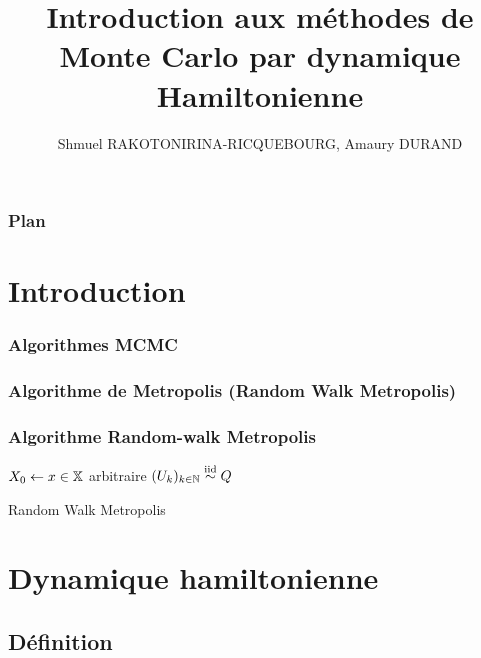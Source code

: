 \documentclass[10pt]{beamer}
\title[HMC]{Introduction aux méthodes de Monte Carlo par dynamique Hamiltonienne}
\author{Shmuel RAKOTONIRINA-RICQUEBOURG, Amaury DURAND}
\begin{document}
\begin{frame}
\titlepage
\end{frame}
\begin{frame}
  \frametitle{Plan}
  \tableofcontents[hideallsubsections]
\end{frame}

\section{Introduction}

\subsubsection{Algorithmes MCMC}


\subsubsection{Algorithme de Metropolis (Random Walk Metropolis)}

\begin{frame}
  \frametitle{Algorithme Random-walk Metropolis}
	\begin{center}
		\begin{algorithm}[H]
			$X_0 \leftarrow x \in \mathbb{X}$ arbitraire\;
			$(U_k)_{k \in \mathbb{N}} \stackrel{\rm iid}{\sim} Q$ \;
			\caption{Random Walk Metropolis}
			\label{algo:metropolis}
		\end{algorithm}
	\end{center}
\end{frame}

\section{Dynamique hamiltonienne}
\subsection{Définition}
 
\end{document}

